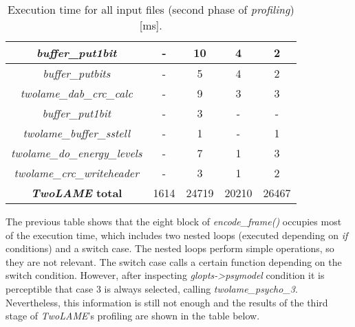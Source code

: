 \begin{table}[H]
\begin{tabular}{|c|c|c|c|c|}
    \hline
     \multicolumn{1}{|c|}{\textit{buffer\_put1bit}} & - & 10 & 4 & 2 \\
    \hline
     \multicolumn{1}{|c|}{\textit{buffer\_putbits}} & - & 5 & 4 & 2 \\
    \hline
     \multicolumn{1}{|c|}{\textit{twolame\_dab\_crc\_calc}} & - & 9 & 3 &  3 \\
    \hline
     \multicolumn{1}{|c|}{\textit{buffer\_put1bit}} & - & 3 & - &  - \\
    \hline
     \multicolumn{1}{|c|}{\textit{twolame\_buffer\_sstell}} & - & 1 & - & 1  \\
    \hline
     \multicolumn{1}{|c|}{\textit{twolame\_do\_energy\_levels}} & - & 7 & 1 & 3  \\
    \hline
     \multicolumn{1}{|c|}{\textit{twolame\_crc\_writeheader}} & - & 3 & 1 &  2  \\ 
    \hline
    \multicolumn{1}{|c|}{\textbf{\textit{TwoLAME} total}}  & 1614 & 24719 & 20210 & 26467 \\ 
    \hline
    \end{tabular}
    \caption{Execution time for all input files (second phase of \textit{profiling}) [ms].}
    \label{profiling2}
\end{table}

The previous table shows that the eight block of \textit{encode\_frame()} occupies most of the execution time, which includes two nested loops (executed depending on \textit{if} conditions) and a switch case. The nested loops perform simple operations, so they are not relevant. The switch case calls a certain function depending on the switch condition. However, after inspecting \textit{glopts->psymodel} condition it is perceptible that case 3 is always selected, calling \textit{twolame\_psycho\_3}. Nevertheless, this information is still not enough and the results of the third stage of \textit{TwoLAME}'s profiling are shown in the table below.

